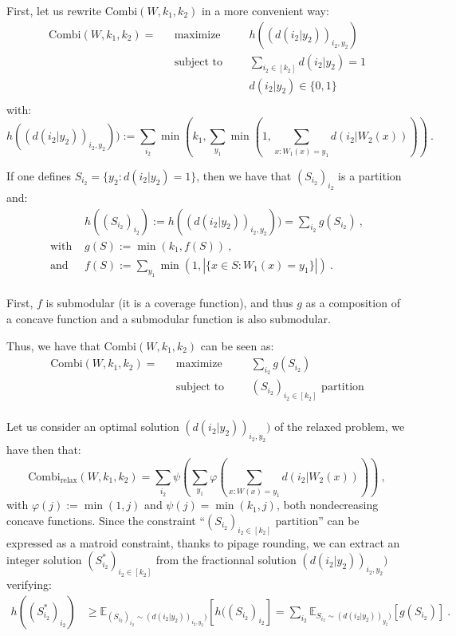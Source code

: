 \documentclass[11pt]{article}
\theoremstyle{definition}
\theoremstyle{remark}
\DeclareMathOperator{\maxi}{\text{maximize}}
\DeclareMathOperator{\st}{\text{subject to}}
\begin{document}
First, let us rewrite $\textrm{Combi}(W,k_1,k_2)$ in a more convenient way:
\begin{equation}
  \begin{aligned}
    \textrm{Combi}(W,k_1,k_2) = &&{\maxi} &&& h((d(i_2|y_2))_{i_2,y_2})\\
    &&\st &&& \sum_{i_2 \in [k_2]} d(i_2|y_2) = 1\\
    &&&&& d(i_2|y_2) \in \{0,1\}\\
  \end{aligned}
\end{equation}
with:
\[ h((d(i_2|y_2))_{i_2,y_2})) := \sum_{i_2} \min\left(k_1,\sum_{y_1}\min\left(1,\sum_{x:W_1(x)=y_1}d(i_2|W_2(x))\right)\right) \ . \]

If one defines $S_{i_2} =\{ y_2 : d(i_2|y_2) = 1 \}$, then we have that $(S_{i_2})_{i_2}$ is a partition and:
\begin{equation}
  \begin{aligned}
    & h((S_{i_2})_{i_2}) := h((d(i_2|y_2))_{i_2,y_2})) = \sum_{i_2} g(S_{i_2}) \ ,\\
    \text{with } &g(S) := \min(k_1,f(S)) \ ,\\
    \text{and } &f(S) := \sum_{y_1}\min\left(1,|\{x \in S: W_1(x)=y_1\}|\right) \ .\\
  \end{aligned}
\end{equation}

First, $f$ is submodular (it is a coverage function), and thus $g$ as a composition of a concave function and a submodular function is also submodular.

Thus, we have that $\textrm{Combi}(W,k_1,k_2)$ can be seen as:
\begin{equation}
  \begin{aligned}
    \textrm{Combi}(W,k_1,k_2) = &&{\maxi} &&& \sum_{i_2} g(S_{i_2})\\
    &&\st &&& (S_{i_2})_{i_2 \in [k_2]} \text{ partition}\\
  \end{aligned}
\end{equation}

Let us consider an optimal solution $(d(i_2|y_2))_{i_2,y_2})$ of the relaxed problem, we have then that:
\[\textrm{Combi}_{\text{relax}}(W,k_1,k_2) = \sum_{i_2}\psi\left(\sum_{y_1}\varphi\left(\sum_{x:W(x)=y_1}d(i_2|W_2(x))\right)\right)\ , \]
with $\varphi(j) := \min(1,j)$ and $\psi(j) = \min(k_1,j)$, both nondecreasing concave functions. Since the constraint ``$(S_{i_2})_{i_2 \in [k_2]} \text{ partition}$'' can be expressed as a matroid constraint, thanks to pipage rounding, we can extract an integer solution $(S^*_{i_2})_{i_2 \in [k_2]}$ from the fractionnal solution $(d(i_2|y_2))_{i_2,y_2})$ verifying:
\begin{equation}
  \begin{aligned}
    h((S^*_{i_2})_{i_2}) &\geq \mathbb{E}_{(S_{i_2})_{i_2} \sim (d(i_2|y_2))_{i_2,y_2})}\left[h((S_{i_2})_{i_2}\right] = \sum_{i_2} \mathbb{E}_{S_{i_2} \sim (d(i_2|y_2))_{y_2})}\left[g(S_{i_2})\right] \ .
  \end{aligned}
\end{equation}
\end{document}
